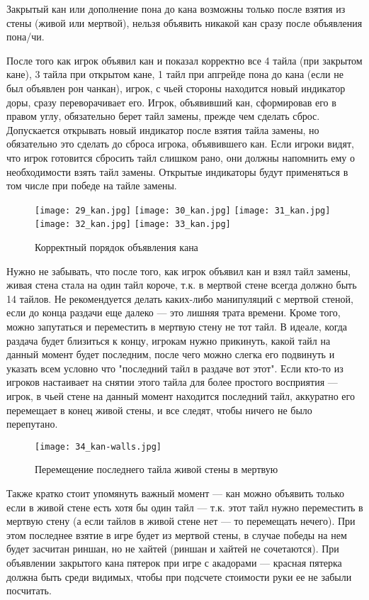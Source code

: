 Закрытый кан или дополнение пона до кана возможны только после взятия из стены (живой или мертвой), нельзя объявить никакой кан сразу после объявления пона/чи.

После того как игрок объявил кан и показал корректно все 4 тайла (при закрытом кане), 3 тайла при открытом кане, 1 тайл при апгрейде пона до кана (если не был объявлен рон чанкан), игрок, с чьей стороны находится новый индикатор доры, сразу переворачивает его. Игрок, объявивший кан, сформировав его в правом углу, обязательно берет тайл замены, прежде чем сделать сброс. Допускается открывать новый индикатор после взятия тайла замены, но обязательно это сделать до сброса игрока, объявившего кан. Если игроки видят, что игрок готовится сбросить тайл слишком рано, они должны напомнить ему о необходимости взять тайл замены. Открытые индикаторы будут применяться в том числе при победе на тайле замены.

\begin{figure}[H]
	\centering
	\texttt{[image: 29\_kan.jpg]}
	\texttt{[image: 30\_kan.jpg]}
	\texttt{[image: 31\_kan.jpg]}
	\texttt{[image: 32\_kan.jpg]}
	\texttt{[image: 33\_kan.jpg]}
	\caption{Корректный порядок объявления кана}
\end{figure}

Нужно не забывать, что после того, как игрок объявил кан и взял тайл замены, живая стена стала на один тайл короче, т.к. в мертвой стене всегда должно быть 14 тайлов. Не рекомендуется делать каких-либо манипуляций с мертвой стеной, если до конца раздачи еще далеко --- это лишняя трата времени. Кроме того, можно запутаться и переместить в мертвую стену не тот тайл. В идеале, когда раздача будет близиться к концу, игрокам нужно прикинуть, какой тайл на данный момент будет последним, после чего можно слегка его подвинуть и указать всем условно что "последний тайл в раздаче вот этот". Если кто-то из игроков настаивает на снятии этого тайла для более простого восприятия --- игрок, в чьей стене на данный момент находится последний тайл, аккуратно его перемещает в конец живой стены, и все следят, чтобы ничего не было перепутано.

\begin{figure}[H]
	\centering
	\texttt{[image: 34\_kan-walls.jpg]}
	\caption{Перемещение последнего тайла живой стены в мертвую}
\end{figure}

Также кратко стоит упомянуть важный момент --- кан можно объявить только если в живой стене есть хотя бы один тайл --- т.к. этот тайл нужно переместить в мертвую стену (а если тайлов в живой стене нет --- то перемещать нечего). При этом последнее взятие в игре будет из мертвой стены, в случае победы на нем будет засчитан риншан, но не хайтей (риншан и хайтей не сочетаются). При объявлении закрытого кана пятерок при игре с акадорами --- красная пятерка должна быть среди видимых, чтобы при подсчете стоимости руки ее не забыли посчитать.

